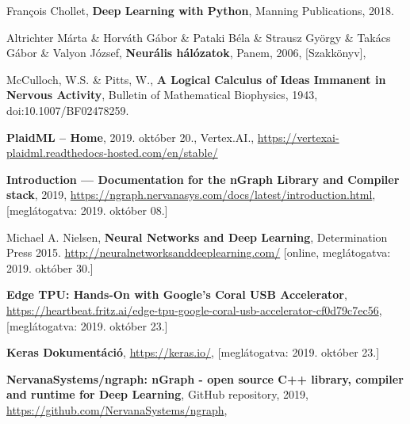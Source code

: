 \begin{thebibliography}{9}
	François Chollet,
	\textbf{Deep Learning with Python},
	Manning Publications,
	2018.

	Altrichter Márta \& Horváth Gábor \& Pataki Béla \& Strausz György \& Takács Gábor \& Valyon József,
	\textbf{Neurális hálózatok},
	Panem,
	2006,
	[Szakkönyv],

McCulloch, W.S. \& Pitts, W.,
\textbf{A Logical Calculus of Ideas Immanent in Nervous Activity},
Bulletin of Mathematical Biophysics,
1943,
doi:10.1007/BF02478259.




\textbf{PlaidML -- Home},
2019. október 20.,
Vertex.AI.,
\newline\url{https://vertexai-plaidml.readthedocs-hosted.com/en/stable/}

\textbf{Introduction --- Documentation for the {nGraph} Library and Compiler stack},
2019,
\newline\url{https://ngraph.nervanasys.com/docs/latest/introduction.html},
[meglátogatva: 2019. október 08.]


	Michael A. Nielsen,
	\textbf{Neural Networks and Deep Learning},
	Determination Press
	2015.
	\newline\url{http://neuralnetworksanddeeplearning.com/}
	[online, meglátogatva: 2019. október 30.]
	
	\textbf{Edge TPU: Hands-On with Google’s Coral USB Accelerator},
	\newline\url{https://heartbeat.fritz.ai/edge-tpu-google-coral-usb-accelerator-cf0d79c7ec56},
	[meglátogatva: 2019. október 23.]
	
	\textbf{Keras Dokumentáció},
	\newline\url{https://keras.io/},
	[meglátogatva: 2019. október 23.]
	
	\textbf{NervanaSystems/ngraph: nGraph - open source C++ library, compiler and runtime for Deep Learning},
	GitHub repository,
	2019,
	\newline\url{https://github.com/NervanaSystems/ngraph},


\end{thebibliography}
